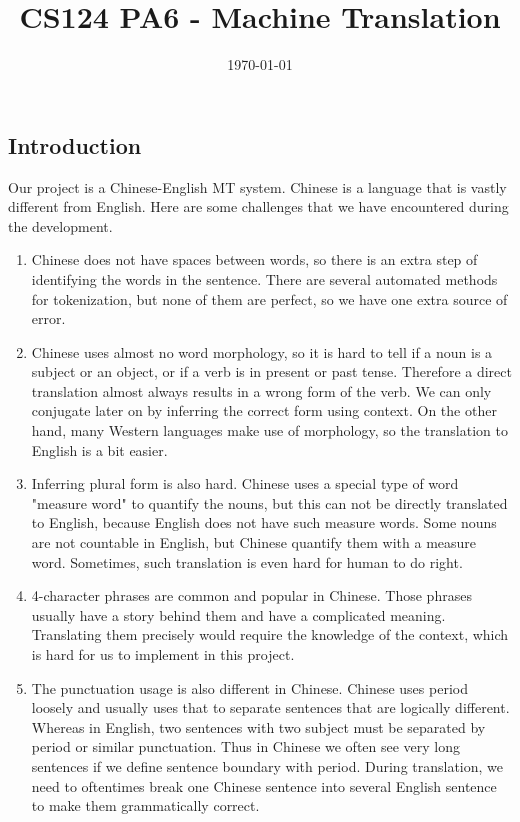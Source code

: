 \documentclass[11pt]{article} %
\begin{document}
\begin{CJK}{UTF8}{gbsn}
\title{CS124 PA6 - Machine Translation}
\date{\today}
\maketitle

\section{Introduction}
Our project is a Chinese-English MT system.
Chinese is a language that is vastly different from English. Here are some challenges that we have encountered during the development.
\begin{enumerate}
\item Chinese does not have spaces between words, so there is an extra step of identifying the words in the sentence.
There are several automated methods for tokenization, but none of them are perfect, so we have one extra source of error.

\item Chinese uses almost no word morphology, so it is hard to tell if a noun is a subject or an object, or if a verb is in present or past tense.
Therefore a direct translation almost always results in a wrong form of the verb. We can only conjugate later on by inferring the correct form using context. On the other hand, many Western languages make use of morphology, so the translation to English is a bit easier.

\item Inferring plural form is also hard.
Chinese uses a special type of word "measure word" to quantify the nouns, but this can not be directly translated to English, because English does not have such measure words. Some nouns are not countable in English, but Chinese quantify them with a measure word.
Sometimes, such translation is even hard for human to do right. 

\item 4-character phrases are common and popular in Chinese.
Those phrases usually have a story behind them and have a complicated meaning.
Translating them precisely would require the knowledge of the context, which is hard for us to implement in this project.

\item The punctuation usage is also different in Chinese. Chinese uses period loosely and usually uses that to separate sentences that are logically different. Whereas in English, two sentences with two subject must be separated by period or similar punctuation. Thus in Chinese we often see very long sentences if we define sentence boundary with period. During translation, we need to oftentimes break one Chinese sentence into several English sentence to make them grammatically correct.


\end{enumerate}
\end{CJK}
\end{document}
